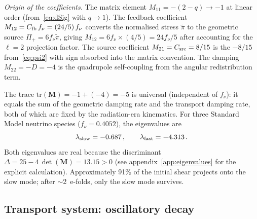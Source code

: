 \documentclass[a4paper,11pt]{article}
\begin{document}
\textit{Origin of the coefficients.}  The matrix element $M_{11} = -(2-q) \to -1$ at linear order (from~\eqref{eq:dSig} with $q \to 1$).  The feedback coefficient $M_{12} = C_{\rm fb}\,f_\nu = (24/5)\,f_\nu$ converts the normalised stress $\tilde\pi$ to the geometric source $\Pi_+ = 6 f_\nu \tilde\pi$, giving $M_{12} = 6f_\nu \times (4/5) = 24f_\nu/5$ after accounting for the $\ell = 2$ projection factor.  The source coefficient $M_{21} = C_{\rm src} = 8/15$ is the $-8/15$ from~\eqref{eq:psi2} with sign absorbed into the matrix convention.  The damping $M_{22} = -D = -4$ is the quadrupole self-coupling from the angular redistribution term.

The trace $\mathrm{tr}(\mathbf{M}) = -1 + (-4) = -5$ is universal (independent of $f_\nu$): it equals the sum of the geometric damping rate and the transport damping rate, both of which are fixed by the radiation-era kinematics.  For three Standard Model neutrino species ($f_\nu = 0.4052$), the eigenvalues are
\begin{equation}
\lambda_{\rm slow} = -0.687\,,\qquad \lambda_{\rm fast} = -4.313\,.\label{eq:lambdas}
\end{equation}
Both eigenvalues are real because the discriminant $\Delta = 25 - 4\,\det(\mathbf{M}) = 13.15 > 0$ (see appendix~\ref{app:eigenvalues} for the explicit calculation).  Approximately 91\% of the initial shear projects onto the slow mode; after $\sim$2~e-folds, only the slow mode survives.

\subsection{Transport system: oscillatory decay}\label{sec:eigen_transport}
\end{document}
